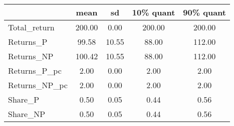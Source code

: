 \begin{tabular}{lcccc}
\toprule
{} &    mean &     sd &  10\% quant &  90\% quant \\
\midrule
Total\_return  &  200.00 &   0.00 &     200.00 &     200.00 \\
Returns\_P     &   99.58 &  10.55 &      88.00 &     112.00 \\
Returns\_NP    &  100.42 &  10.55 &      88.00 &     112.00 \\
Returns\_P\_pc  &    2.00 &   0.00 &       2.00 &       2.00 \\
Returns\_NP\_pc &    2.00 &   0.00 &       2.00 &       2.00 \\
Share\_P       &    0.50 &   0.05 &       0.44 &       0.56 \\
Share\_NP      &    0.50 &   0.05 &       0.44 &       0.56 \\
\bottomrule
\end{tabular}
